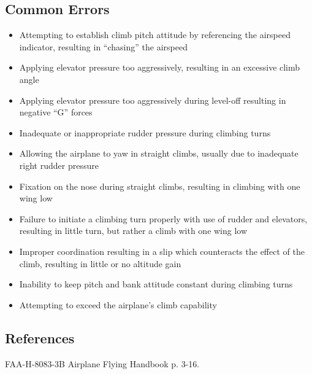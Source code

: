 \subsection{Common Errors}

\begin{itemize}
  \item Attempting to establish climb pitch attitude by referencing the
    airspeed indicator, resulting in ``chasing'' the airspeed
  \item Applying elevator pressure too aggressively, resulting in an excessive
    climb angle
  \item Applying elevator pressure too aggressively during level-off resulting
    in negative ``G'' forces
  \item Inadequate or inappropriate rudder pressure during climbing turns
  \item Allowing the airplane to yaw in straight climbs, usually due to
    inadequate right rudder pressure
  \item Fixation on the nose during straight climbs, resulting in climbing with
    one wing low
  \item Failure to initiate a climbing turn properly with use of rudder and
    elevators, resulting in little turn, but rather a climb with one wing low
  \item Improper coordination resulting in a slip which counteracts the effect
    of the climb, resulting in little or no altitude gain
  \item Inability to keep pitch and bank attitude constant during climbing
    turns
  \item Attempting to exceed the airplane's climb capability
\end{itemize}

\subsection{References}

FAA-H-8083-3B Airplane Flying Handbook p. 3-16.

